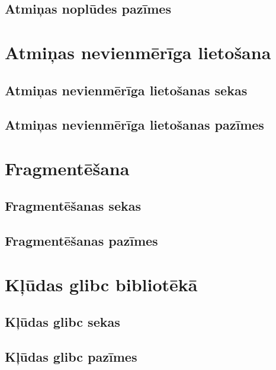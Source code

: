 \subsection{Atmiņas noplūdes pazīmes}



\section{Atmiņas nevienmērīga lietošana}
\subsection{Atmiņas nevienmērīga lietošanas sekas}
\subsection{Atmiņas nevienmērīga lietošanas pazīmes}

\section{Fragmentēšana}
\subsection{Fragmentēšanas sekas}
\subsection{Fragmentēšanas pazīmes}

\section{Kļūdas glibc bibliotēkā}
\subsection{Kļūdas glibc sekas}
\subsection{Kļūdas glibc pazīmes}
